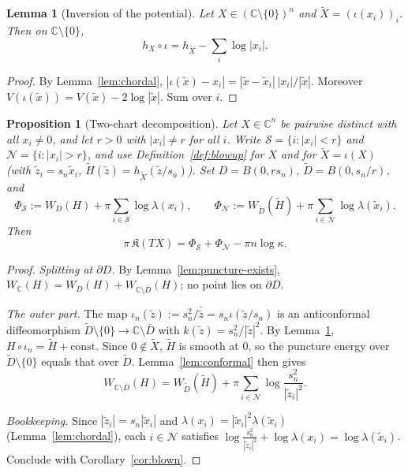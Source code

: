 \documentclass[11pt]{article}
\newtheorem{proposition}[theorem]{Proposition}
\newtheorem{lemma}[theorem]{Lemma}
\theoremstyle{definition}
\theoremstyle{remark}
\newcommand{\C}{\mathbb C}
\begin{document}
\begin{lemma}[Inversion of the potential]\label{lem:inversion}
Let $X\in(\C\setminus\{0\})^n$ and $\tilde X=(\iota(x_i))_i$. Then on $\C\setminus\{0\}$,
\[
h_X\circ\iota=h_{\tilde X}-\sum_i\log|x_i| .
\]
\end{lemma}
\begin{proof}
By Lemma~\ref{lem:chordal},
$|\iota(\tilde x)-x_i|=|\tilde x-\tilde x_i|\,|x_i|/|\tilde x|$. Moreover
$V(\iota(\tilde x))=V(\tilde x)-2\log|\tilde x|$. Sum over $i$.
\end{proof}

\begin{proposition}[Two-chart decomposition]\label{prop:twochart}
Let $X\in\C^n$ be pairwise distinct with all $x_i\neq0$, and let $r>0$ with $|x_i|\ne r$ for all
$i$. Write $\mathcal S=\{i:|x_i|<r\}$ and $\mathcal N=\{i:|x_i|>r\}$, and use
Definition~\ref{def:blowup} for $X$ and for $\tilde X=\iota(X)$ (with $\tilde z_i=s_n\tilde x_i$,
$\tilde H(\tilde z)=h_{\tilde X}(\tilde z/s_n)$). Set $D=B(0,rs_n)$, $\tilde D=B(0,s_n/r)$, and
\[
\Phi_{\mathcal S}:=W_D(H)+\pi\sum_{i\in\mathcal S}\log\lambda(x_i),\qquad
\Phi_{\mathcal N}:=W_{\tilde D}(\tilde H)+\pi\sum_{i\in\mathcal N}\log\lambda(\tilde x_i).
\]
Then
\[
\pi\,\mathfrak K(TX)=\Phi_{\mathcal S}+\Phi_{\mathcal N}-\pi n\log\kappa .
\]
\end{proposition}
\begin{proof}
\emph{Splitting at $\partial D$.} By Lemma~\ref{lem:puncture-exists},
$W_\C(H)=W_D(H)+W_{\C\setminus\bar D}(H)$; no point lies on $\partial D$.

\emph{The outer part.} The map $\iota_n(\tilde z):=s_n^2/\bar{\tilde z}=s_n\iota(\tilde z/s_n)$
is an anticonformal diffeomorphism $\tilde D\setminus\{0\}\to\C\setminus\bar D$ with
$k(\tilde z)=s_n^2/|\tilde z|^2$. By Lemma~\ref{lem:inversion}, $H\circ\iota_n=\tilde H+\mathrm{const}$.
Since $0\notin\tilde X$, $\tilde H$ is smooth at $0$, so the puncture energy over
$\tilde D\setminus\{0\}$ equals that over $\tilde D$. Lemma~\ref{lem:conformal} then gives
\[
W_{\C\setminus\bar D}(H)=W_{\tilde D}(\tilde H)+\pi\sum_{i\in\mathcal N}\log\frac{s_n^2}{|\tilde z_i|^2}.
\]

\emph{Bookkeeping.} Since $|\tilde z_i|=s_n|\tilde x_i|$ and
$\lambda(x_i)=|\tilde x_i|^2\lambda(\tilde x_i)$ (Lemma~\ref{lem:chordal}), each
$i\in\mathcal N$ satisfies $\log\frac{s_n^2}{|\tilde z_i|^2}+\log\lambda(x_i)=\log\lambda(\tilde x_i)$.
Conclude with Corollary~\ref{cor:blown}.
\end{proof}
\end{document}
